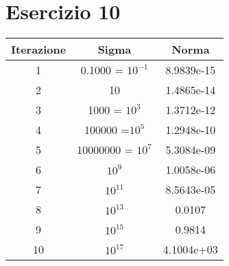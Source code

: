 \section{Esercizio 10}

\begin{table}[ht]
	\centering
	\small
	\begin{tabular}{| c | c | c |}
	\hline
	Iterazione & Sigma & Norma\\
	\hline
	 1 & 0.1000 = $10^{-1}$ & 8.9839e-15\\
	\hline
	2 & 10 & 1.4865e-14\\
	\hline
	3 & 1000 = $10^{3}$ & 1.3712e-12\\
	\hline
	4 & 100000 =$10^{5}$ & 1.2948e-10\\
	\hline
	 5 & 10000000 = $10^{7}$ & 5.3084e-09\\
	\hline
	6 & $10^{9}$ & 1.0058e-06\\
	\hline 
	7 &  $10^{11}$ & 8.5643e-05\\
	\hline
	8&  $10^{13}$ & 0.0107\\
	\hline
	9&  $10^{15}$ & 0.9814\\
	\hline
	10&  $10^{17}$ &4.1004e+03\\
	\hline
	\end{tabular}
\end{table}